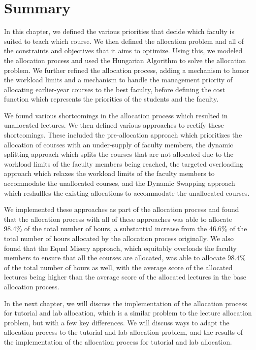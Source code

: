 \section{Summary}

In this chapter, we defined the various priorities that decide which faculty is suited to teach which course. We then defined the allocation problem and all of the constraints and objectives that it aims to optimize. Using this, we modeled the allocation process and used the Hungarian Algorithm to solve the allocation problem. We further refined the allocation process, adding a mechanism to honor the workload limits and a mechanism to handle the management priority of allocating earlier-year courses to the best faculty, before defining the cost function which represents the priorities of the students and the faculty.

We found various shortcomings in the allocation process which resulted in unallocated lectures. We then defined various approaches to rectify these shortcomings. These included the pre-allocation approach which prioritizes the allocation of courses with an under-supply of faculty members, the dynamic splitting approach which splits the courses that are not allocated due to the workload limits of the faculty members being reached, the targeted overloading approach which relaxes the workload limits of the faculty members to accommodate the unallocated courses, and the Dynamic Swapping approach which reshuffles the existing allocations to accommodate the unallocated courses.

We implemented these approaches as part of the allocation process and found that the allocation process with all of these approaches was able to allocate 98.4\% of the total number of hours, a substantial increase from the 46.6\% of the total number of hours allocated by the allocation process originally. We also found that the Equal Misery approach, which equitably overloads the faculty members to ensure that all the courses are allocated, was able to allocate 98.4\% of the total number of hours as well, with the average score of the allocated lectures being higher than the average score of the allocated lectures in the base allocation process.

In the next chapter, we will discuss the implementation of the allocation process for tutorial and lab allocation, which is a similar problem to the lecture allocation problem, but with a few key differences. We will discuss ways to adapt the allocation process to the tutorial and lab allocation problem, and the results of the implementation of the allocation process for tutorial and lab allocation.
